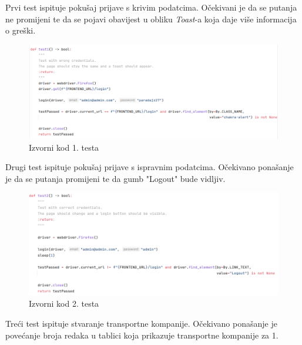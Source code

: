 			Prvi test ispituje pokušaj prijave s krivim podatcima. Očekivani je da se putanja ne promijeni te da se pojavi obavijest u obliku \textit{Toast}-a koja daje više informacija o greški.   
			
			\begin{figure}[H]
				\includegraphics[width=\textwidth]{slike/selenium_test1.png}
				\centering
				\caption{Izvorni kod 1. testa}
				\label{fig:izvorni-kod-testa-1}
			\end{figure}
		
			Drugi test ispituje pokušaj prijave s ispravnim podatcima. Očekivano ponašanje je da se putanja promijeni te da gumb "Logout" bude vidljiv.
			
			\begin{figure}[H]
				\includegraphics[width=\textwidth]{slike/selenium_test2.png}
				\centering
				\caption{Izvorni kod 2. testa}
				\label{fig:izvorni-kod-testa-2}
			\end{figure}
		
			Treći test ispituje stvaranje transportne kompanije. Očekivano ponašanje je povećanje broja redaka u tablici koja prikazuje transportne kompanije za 1.
		
